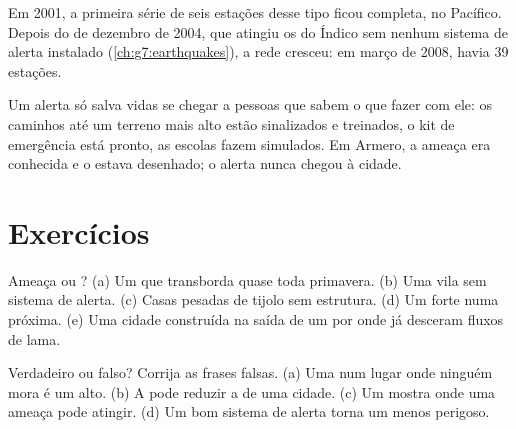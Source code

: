 \begin{history}
Em 2001, a primeira série de seis estações desse tipo ficou completa, no
 Pacífico. Depois do  de dezembro de 2004, que atingiu os
 do  Índico sem nenhum sistema de alerta instalado
(\cref{ch:g7:earthquakes}), a rede cresceu: em março de 2008, havia 39
estações.
\end{history}

Um alerta só salva vidas se chegar a pessoas que sabem o que fazer com
ele: os caminhos até um terreno mais alto estão sinalizados e treinados,
o kit de emergência está pronto, as escolas fazem simulados. Em Armero, a
ameaça era conhecida e o  estava desenhado; o alerta nunca chegou à
cidade.

\section{Exercícios}

\begin{exercise}[$\star$]\label{exo:g9:natural-risks:1}
Ameaça ou ? (a) Um  que transborda quase toda
primavera. (b) Uma vila sem sistema de alerta. (c) Casas pesadas de
tijolo sem estrutura. (d) Um forte  numa  próxima. (e) Uma
cidade construída na saída de um  por onde já desceram fluxos de
lama.
\end{exercise}

\begin{exercise}[$\star$]\label{exo:g9:natural-risks:2}
Verdadeiro ou falso? Corrija as frases falsas. (a) Uma  num
lugar onde ninguém mora é um  alto. (b) A  pode reduzir a
 de uma cidade. (c) Um  mostra onde uma
ameaça pode atingir. (d) Um bom sistema de alerta torna um  menos
perigoso.
\end{exercise}

